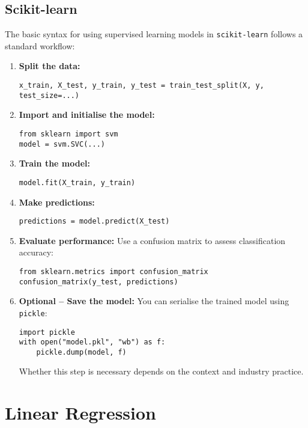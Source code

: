 \documentclass[9pt]{extarticle}
\begin{document}
\subsection{Scikit-learn}

The basic syntax for using supervised learning models in \texttt{scikit-learn} follows a standard workflow:

\begin{enumerate}
    \item \textbf{Split the data:}
    \begin{verbatim}
x_train, X_test, y_train, y_test = train_test_split(X, y, test_size=...)
    \end{verbatim}

    \item \textbf{Import and initialise the model:}
    \begin{verbatim}
from sklearn import svm
model = svm.SVC(...)
    \end{verbatim}

    \item \textbf{Train the model:}
    \begin{verbatim}
model.fit(X_train, y_train)
    \end{verbatim}

    \item \textbf{Make predictions:}
    \begin{verbatim}
predictions = model.predict(X_test)
    \end{verbatim}

    \item \textbf{Evaluate performance:}
    Use a confusion matrix to assess classification accuracy:
    \begin{verbatim}
from sklearn.metrics import confusion_matrix
confusion_matrix(y_test, predictions)
    \end{verbatim}

    \item \textbf{Optional – Save the model:}
    You can serialise the trained model using \texttt{pickle}:
    \begin{verbatim}
import pickle
with open("model.pkl", "wb") as f:
    pickle.dump(model, f)
    \end{verbatim}
    Whether this step is necessary depends on the context and industry practice.
\end{enumerate}

\section{Linear Regression}
\end{document}

